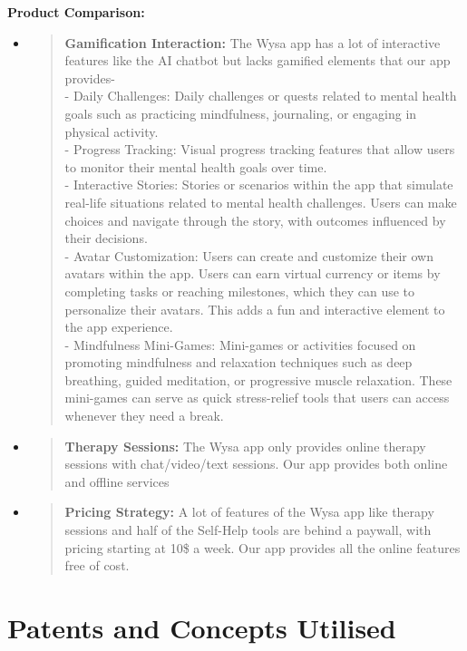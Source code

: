 \documentclass[manuscript,screen,review]{acmart}
\begin{document}
\textbf{Product Comparison:}

\begin{itemize}
\item
  \begin{quote}
  \textbf{Gamification Interaction:} The Wysa app has a lot of
  interactive features like the AI chatbot but lacks gamified elements
  that our app provides-\\
  - Daily Challenges: Daily challenges or quests related to mental
  health goals such as practicing mindfulness, journaling, or engaging
  in physical activity.\\
  - Progress Tracking: Visual progress tracking features that allow
  users to monitor their mental health goals over time.\\
  - Interactive Stories: Stories or scenarios within the app that
  simulate real-life situations related to mental health challenges.
  Users can make choices and navigate through the story, with outcomes
  influenced by their decisions.\\
  - Avatar Customization: Users can create and customize their own
  avatars within the app. Users can earn virtual currency or items by
  completing tasks or reaching milestones, which they can use to
  personalize their avatars. This adds a fun and interactive element to
  the app experience.\\
  - Mindfulness Mini-Games: Mini-games or activities focused on
  promoting mindfulness and relaxation techniques such as deep
  breathing, guided meditation, or progressive muscle relaxation. These
  mini-games can serve as quick stress-relief tools that users can
  access whenever they need a break.
  \end{quote}
\item
  \begin{quote}
  \textbf{Therapy Sessions:} The Wysa app only provides online therapy
  sessions with chat/video/text sessions. Our app provides both online
  and offline services
  \end{quote}
\item
  \begin{quote}
  \textbf{Pricing Strategy:} A lot of features of the Wysa app like
  therapy sessions and half of the Self-Help tools are behind a paywall,
  with pricing starting at 10\$ a week. Our app provides all the online
  features free of cost.
  \end{quote}
\end{itemize}

\section{Patents and Concepts Utilised}
\end{document}
